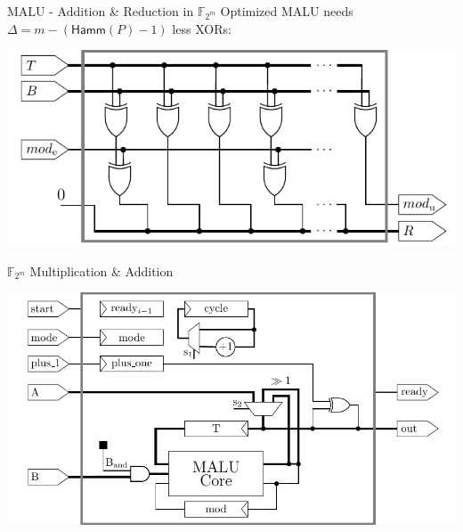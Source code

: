 \documentclass[svgnames]{beamer}
\newenvironment{changemargin}[2]{%
\begin{list}{}{%
\setlength{\topsep}{0pt}%
\setlength{\leftmargin}{#1}%
\setlength{\rightmargin}{#2}%
\setlength{\listparindent}{\parindent}%
\setlength{\itemindent}{\parindent}%
\setlength{\parsep}{\parskip}%
}%
\item[]}{\end{list}}
\begin{document}
\begin{frame}{MALU - Addition \& Reduction in $\mathbb{F}_{2^m}$}
	Optimized MALU needs $\Delta = m - \left( \textsf{Hamm}(P) - 1 \right)$ less XORs:\\[1.7em]
	\begin{changemargin}{-2cm}{-2cm}
	\begin{center}\includegraphics[height=0.5\paperheight]{images/malu-optimized}\end{center}
	\end{changemargin}
\end{frame}

\begin{frame}{$\mathbb{F}_{2^m}$ Multiplication \& Addition}
	\begin{changemargin}{-4cm}{-4cm}
		\begin{center}\includegraphics[height=0.65\paperheight]{images/wrapper-gf2m}\end{center}
	\end{changemargin}
\end{frame}
\end{document}
